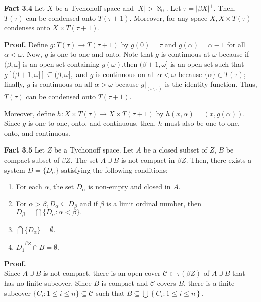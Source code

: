 \documentclass{article}
\begin{document}
\vskip 30pt

\textbf{Fact 3.4} Let $X$ be a Tychonoff space and $|X|>\aleph_0$. Let $\tau=|\beta X|^+$. Then, $T(\tau)$ can be condensed onto $T(\tau+1).$ Moreover, for any space $X, X\times T(\tau)$ condenses onto $X\times T(\tau+1).$

\vskip 15pt

\textbf{Proof.} Define $g:T(\tau) \rightarrow T(\tau+1)$ by $g(0)=\tau$ and $g(\alpha)=\alpha-1$ for all $\alpha<\omega$. Now, $g$ is one-to-one and onto. Note that $g$ is continuous at $\omega$ because if $(\beta, \omega]$ is an open set containing $g(\omega)$,then $(\beta+1,\omega]$ is an open set such that $g\left[(\beta+1, \omega]\right] \subseteq (\beta, \omega],$ and $g$ is continuous on all $\alpha<\omega$ because $\{\alpha\} \in T(\tau)$; finally, $g$ is continuous on all $\alpha>\omega$ because $g|_{(\omega, \tau)}$ is the identity function. Thus, $T(\tau)$ can be condensed onto $T(\tau+1).$

\vskip 10pt


Moreover, define $h: X\times T(\tau)\rightarrow X\times T(\tau+1)$ by $h(x,\alpha)=(x,g(\alpha)).$ Since $g$ is one-to-one, onto, and continuous, then, $h$ must also be one-to-one, onto, and continuous. 


\vskip 30pt


\textbf{Fact 3.5} Let $Z$ be a Tychonoff space. Let $A$ be a closed subset of $Z$, $B$ be compact subset of $\beta Z$. 
The set $A\cup B$ is not compact in $\beta Z$. 
Then, there exists a system $D=\{D_\alpha\}$ satisfying the following conditions:
\begin{enumerate}
\item For each $  \alpha  $, the set $ D_\alpha  $ is non-empty and closed in $A$.
\item For $ \alpha>\beta, D_\alpha \subseteq D_\beta  $ and if $  \beta $ is a limit ordinal number, then\\$  D_\beta=\bigcap \{D_\alpha:\alpha <\beta\}.$
\item $ \bigcap\{D_\alpha\}=\emptyset . $
\item $\overline{D_1}^{\beta Z}\cap B =\emptyset.$
	 
\end{enumerate}

\textbf{Proof.} \\
Since $A\cup B $ is not compact, there is an open cover $\mathcal{C} \subset \tau(\beta Z)$ of $A\cup B$ that has no finite subcover.  Since $B$ is compact and $\mathcal{C}$ covers $B$, there is a finite subcover $\{C_i:1\leq i \leq n\}\subseteq \mathcal{C}$ such that $B\subseteq  \bigcup\left\{C_i:1\leq i \leq n\right\}$.
\vskip 10pt
\end{document}
